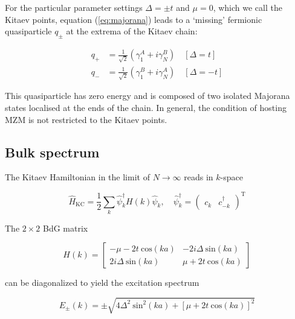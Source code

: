For the particular parameter settings $\Delta = \pm t$ and $\mu = 0$, which we call the Kitaev points, equation (\ref{eq:majorana}) leads to a `missing' fermionic quasiparticle $q_{\pm}$ at the extrema of the Kitaev chain:

\begin{equation}
    \begin{aligned}
       q_{+} &= \frac{1}{\sqrt{2}}(\gamma^{A}_{1}+i\gamma^{B}_{N}) \quad [\Delta = t] \\
       q_{-} &= \frac{1}{\sqrt{2}}(\gamma^{B}_{1}+i\gamma^{A}_{N}) \quad [\Delta = -t]          
    \end{aligned}    
\end{equation}

This quasiparticle has zero energy and is composed of two isolated Majorana states localised at the ends of the chain. In general, the condition of hosting MZM is not restricted to the Kitaev points. \par

\subsection{Bulk spectrum}

The Kitaev Hamiltonian in the limit of $N \rightarrow \infty$ reads in $k$-space 

\begin{equation*}
    \hat{H}_{\text{KC}} = \frac{1}{2}\sum_{k}\hat{\psi}^{\dagger}_{k}H(k)\hat{\psi}_{k}, \quad \hat{\psi}^{\dagger}_{k} = \begin{pmatrix}
       c_{k} & c_{-k}^{\dagger}     
    \end{pmatrix}^{\text{T}}     
\end{equation*}

The $2 \times 2$ BdG matrix

\begin{equation}
    H(k) = 
    \begin{bmatrix}
       -\mu-2t\:\text{cos}(ka) & -2i\Delta \: \text{sin}(ka) \\
       2i\Delta \: \text{sin}(ka) & \mu+2t\: \text{cos}(ka)         
    \end{bmatrix}    
\end{equation}

can be diagonalized to yield the excitation spectrum

\begin{equation}
    E_{\pm}(k) = \pm \sqrt{4\Delta^{2}\:\text{sin}^{2}(ka)+[\mu+2t\: \text{cos}(ka)]^{2}}    
\end{equation}

